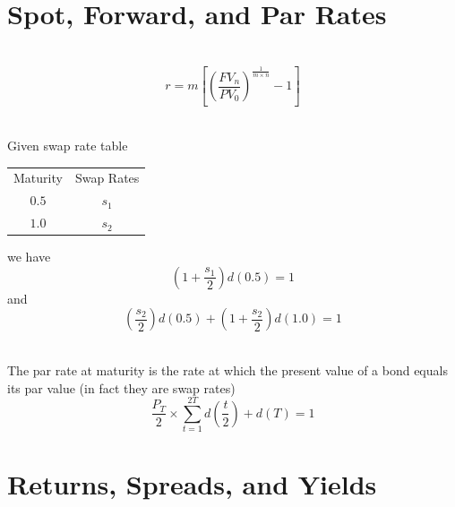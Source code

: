 \documentclass[11pt,fleqn]{book} %
\numberwithin{equation}{section} %
\numberwithin{figure}{section} %
\numberwithin{table}{section} %
\begin{document}
\chapter{Spot, Forward, and Par Rates}
\begin{definition}\textbf{}\\
    $$
    r=m\left[\left(\frac{FV_n}{PV_0}\right)^{\frac{1}{m\times n}}-1\right]
    $$
\end{definition}
\begin{definition}\textbf{}\\
    Given swap rate table
    \begin{center}
        \begin{tabular}{c|c}
            Maturity&Swap Rates\\
            $0.5$&$s_1$\\
            $1.0$&$s_2$\\
        \end{tabular}
    \end{center}
    we have
    $$
    \left(1+\frac{s_1}{2}\right)d(0.5)=1
    $$
    and
    $$
    \left(\frac{s_2}{2}\right)d(0.5)+\left(1+\frac{s_2}{2}\right)d(1.0)=1
    $$
\end{definition}
\begin{definition}\textbf{}\\
    The par rate at maturity is the rate at which the present value of a bond equals its par value (in fact they are swap rates)
    $$
    \frac{P_T}{2}\times\sum_{t=1}^{2T}d\left(\frac{t}{2}\right)+d(T)=1
    $$
\end{definition}
\chapter{Returns, Spreads, and Yields}

\end{document}

